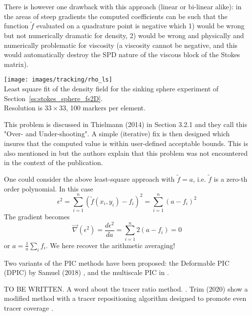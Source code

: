 There is however one drawback with this approach (linear or bi-linear alike):
in the areas of steep gradients the computed coefficients can be such that 
the function $\tilde{f}$ evaluated on a quadrature point 
is negative  which 1) would be wrong but not numerically 
dramatic for density, 2) would be wrong and physically and numerically 
problematic for viscosity (a viscosity cannot be negative, and this would 
automatically destroy the SPD nature of the viscous block of the Stokes matrix).

\begin{center}
\texttt{[image: images/tracking/rho\_ls]}\\
{\captionfont Least square fit of the density field for the 
sinking sphere experiment of Section~\ref{ss:stokes_sphere_fs2D}.\\
Resolution is $33\times33$, 100 markers per element.
}
\end{center}


This problem is discussed in Thielmann \etal (2014) in Section 3.2.1 and they 
call this "Over- and Under-shooting". A simple (iterative) 
fix is then designed which insures that the computed value is within user-defined 
acceptable bounds. This is also mentioned in \cite{galb19} but the authors 
explain that this problem was not encountered in the context of the publication.

\begin{remark}
One could consider the above least-square approach with $\tilde{f}=a$, i.e. $\tilde{f}$ is
a zero-th order polynomial. In this case
\[
\epsilon^2 = \sum_{i=1}^n ( \tilde{f}(x_i,y_i)-f_i)^2 = \sum_{i=1}^n (a-f_i)^2 
\]
The gradient becomes
\[
\vec\nabla(\epsilon^2)= \frac{d \epsilon^2}{da} = \sum_{i=1}^n 2 (a-f_i) = 0
\]
or $a=\frac1n \sum_i f_i$. We here recover the arithmetic averaging!
\end{remark}





\begin{remark}
Two variants of the PIC methods have been proposed: the Deformable PIC (DPIC) 
by Samuel (2018) \cite{samu18}, and the multiscale PIC in \cite{asmo12}.
\end{remark}

\begin{remark}
TO BE WRITTEN.
A word about the tracer ratio method. \cite{taki03}. 
Trim \etal (2020) show a modified method 
with a tracer repositioning algorithm designed to promote even tracer
coverage \cite{trlb20}. 
\end{remark}

